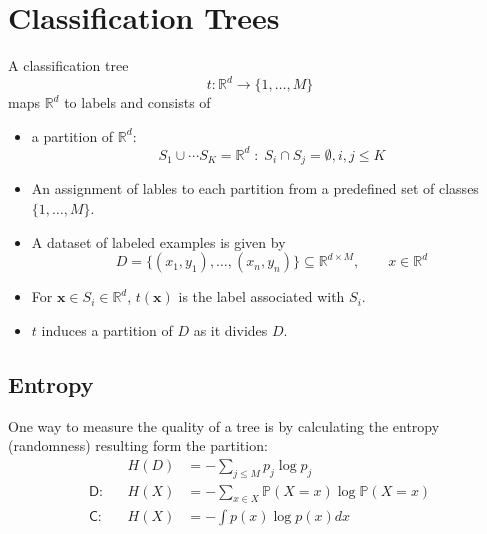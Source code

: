 \section{Classification Trees}
A classification tree
\noindent\begin{equation*}
    t: \mathbb{R}^d \to \{1,\ldots, M\}
\end{equation*}
maps $\mathbb{R}^d$ to labels and consists of
\begin{itemize}
    \item a partition of $\mathbb{R}^d$:
          \noindent\begin{equation*}
              S_1\cup \cdots S_K = \mathbb{R}^d \;:\; S_i\cap S_j=\emptyset , i,j\leq K
          \end{equation*}
    \item An assignment of lables to each partition from a predefined set of classes $\{1,\ldots, M\}$.
    \item A dataset of labeled examples is given by
          \noindent\begin{equation*}
              D=\{(x_{1},y_{1}),\ldots,(x_{n},y_{n})\}\subseteq\mathbb{R}^{d\times M},\qquad x\in \mathbb{R}^d
          \end{equation*}
\end{itemize}


\begin{itemize}
    \item For $\mathbf{x}\in S_i\in\mathbb{R}^d$, $t(\mathbf{x})$ is the label associated with $S_i$.
    \item $t$ induces a partition of $D$ as it divides $D$.
\end{itemize}


\subsection{Entropy}
One way to measure the quality of a tree is by calculating the entropy (randomness) resulting form the partition:
\noindent\begin{align*}
                &  & H(D) & =-\sum_{j\leq M}p_j\log p_j                       \\
    \mathsf{D}: &  & H(X) & =-\sum_{x\in X}\mathbb{P}(X=x)\log\mathbb{P}(X=x) \\
    \mathsf{C}: &  & H(X) & =-\int p(x)\log p(x) dx
\end{align*}


